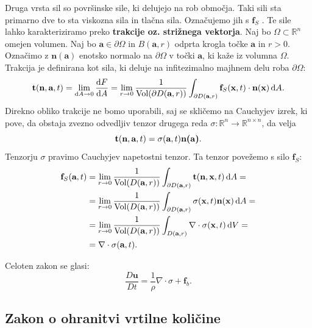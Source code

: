 \documentclass[mat2, tisk]{fmfdelo}
\newcommand{\R}{\mathbb R}
\newcommand{\bd}{\textbf}
\begin{document}
Druga vrsta sil so površinske sile, ki delujejo na rob območja. 
Taki sili sta primarno dve to sta viskozna sila in tlačna sila.
Označujemo jih s $\bd{f}_S$ .
Te sile lahko karakteriziramo preko \bd{trakcije oz. strižnega vektorja}.
Naj bo $\Omega \subset \R^n$ omejen volumen. Naj bo $\bd{a}\in \partial \Omega$ in 
$B(\bd{a}, r)$ odprta krogla točke $\bd{a}$ in $r>0$. Označimo z $\bd{n}(\bd{a})$ enotsko normalo na $\partial \Omega$ v točki $\bd{a}$, ki kaže iz volumna $\Omega$.
Trakcija je definirana kot sila, ki deluje na infitezimalno majhnem delu roba $\partial \Omega$:
\begin{equation}
\bd{t}(\bd{n}, \bd{a}, t) = \lim_{\dif A \rightarrow 0} \frac{\dif F}{\dif A} = \lim_{r \rightarrow 0} \frac{1}{\text{Vol}(\partial D(\bd{a}, r))} \int_{\partial D(\bd{a}, r)} \bd{f}_S(\bd{x}, t) \cdot \bd{n}(\bd{x}) \dif A.
\end{equation}
Direkno obliko trakcije ne bomo uporabili, saj se skličemo na 
Cauchyjev izrek, ki pove, da obstaja zvezno odvedljiv tenzor drugega reda 
$\sigma: \R^n \rightarrow \R^{n\times n}$, 
da velja 
$$
\bd{t}(\bd{n}, \bd{a}, t) = \sigma(\bd{a}, t)\bd{n(\bd{a})}.
$$
Tenzorju $\sigma$ pravimo Cauchyjev napetostni tenzor. 
Ta tenzor povežemo s silo $\bd{f}_S$: 
\begin{align*}
\bd{f}_S(\bd{a}, t) &= \lim_{r \rightarrow 0} \frac{1}{\text{Vol}(D(\bd{a}, r))} \int_{\partial D(\bd{a}, r)} \bd{t}(\bd{n}, \bd{x}, t) \dif A = \\
&= \lim_{r \rightarrow 0} \frac{1}{\text{Vol}(D(\bd{a}, r))} \int_{\partial D(\bd{a}, r)} \sigma(\bd{x}, t) \bd{n}(\bd{x}) \dif A = \\
&= \lim_{r \rightarrow 0} \frac{1}{\text{Vol}(D(\bd{a}, r))} \int_{D(\bd{a}, r)} \nabla \cdot \sigma(\bd{x}, t) \dif V = \\
&= \nabla \cdot \sigma(\bd{a}, t).
\end{align*}

Celoten zakon se glasi:
\begin{equation}
\frac{D \bd{u}}{D t} = \frac{1}{\rho} \nabla \cdot \sigma + \bd{f}_b.
\end{equation}

\subsection{Zakon o ohranitvi vrtilne količine}
\end{document}
